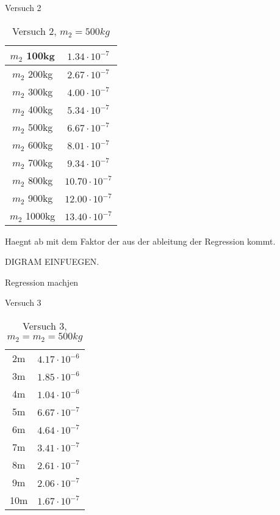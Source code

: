 Versuch 2


\begin{table}[htbp]
    \centering
    \begin{tabular}{c|c}
        \toprule
        $m_2$  100kg & $1.34\cdot 10^{-7}$ \\ 
        \midrule
        $m_2$  200kg & $2.67\cdot 10^{-7}$ \\ 
        \midrule
        $m_2$  300kg & $4.00\cdot 10^{-7}$ \\ 
        \midrule
        $m_2$  400kg & $5.34\cdot 10^{-7}$  \\ 
        \midrule
        $m_2$  500kg & $6.67\cdot 10^{-7}$  \\ 
        \midrule
        $m_2$  600kg & $8.01\cdot 10^{-7}$  \\ 
        \midrule
        $m_2$  700kg & $9.34\cdot 10^{-7}$  \\ 
        \midrule
        $m_2$  800kg & $10.70\cdot 10^{-7}$  \\ 
        \midrule
        $m_2$  900kg & $12.00\cdot 10^{-7}$  \\ 
        \midrule
        $m_2$  1000kg & $13.40\cdot 10^{-7}$  \\ 
        \bottomrule
    \end{tabular}
    \caption{Versuch 2, $m_2 = 500kg$}
\end{table}

Haegnt ab mit dem Faktor der aus der ableitung der Regression kommt.

DIGRAM EINFUEGEN.

Regression machjen



Versuch 3

\begin{table}[htbp]
    \centering
    \begin{tabular}{c|c}
        \toprule
        2m & $4.17\cdot 10^{-6}$ \\
        3m & $1.85\cdot 10^{-6}$ \\
        4m & $1.04\cdot 10^{-6}$ \\
        5m & $6.67\cdot 10^{-7}$ \\
        6m & $4.64\cdot 10^{-7}$ \\
        7m & $3.41\cdot 10^{-7}$ \\
        8m & $2.61\cdot 10^{-7}$ \\
        9m & $2.06\cdot 10^{-7}$ \\
        10m &$ 1.67\cdot 10^{-7}$ \\
        \bottomrule
    \end{tabular}
    \caption{Versuch 3, $m_2 = m_2= 500kg$}
\end{table}

